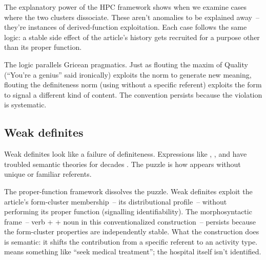 The explanatory power of the HPC framework shows when we examine cases where the two clusters dissociate. These aren't anomalies to be explained away~-- they're instances of derived-function exploitation. Each case follows the same logic: a stable side effect of the article's history gets recruited for a purpose other than its proper function.

The logic parallels Gricean pragmatics. Just as flouting the maxim of Quality (\enquote{You're a genius} said ironically) exploits the norm to generate new meaning, flouting the definiteness norm (using  without a specific referent) exploits the form to signal a different kind of content. The convention persists because the violation is systematic.

\subsection{Weak definites}
\label{sec:10:weak-definites}

Weak definites look like a failure of definiteness. Expressions like , , and  have troubled semantic theories for decades \citep{carlsonsussman2005,aguilarguevarazwarts2010}. The puzzle is how  appears without unique or familiar referents.

The proper-function framework dissolves the puzzle. Weak definites exploit the article's form-cluster membership~-- its distributional profile~-- without performing its proper function (signalling identifiability). The morphosyntactic frame~-- verb +  + noun in this conventionalized construction~-- persists because the form-cluster properties are independently stable. What the construction does is semantic: it shifts the contribution from a specific referent to an activity type.  means something like \enquote{seek medical treatment}; the hospital itself isn't identified.

